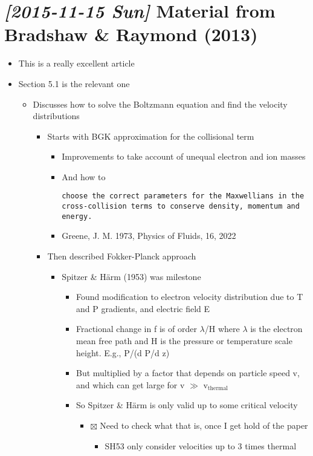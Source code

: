 \documentclass[11pt]{article}
\begin{document}
\section{\textit{[2015-11-15 Sun] } Material from Bradshaw \& Raymond (2013)}
\label{sec:orgheadline6}
\begin{itemize}
\item This is a really excellent article
\item Section 5.1 is the relevant one
\begin{itemize}
\item Discusses how to solve the Boltzmann equation and find the velocity distributions
\begin{itemize}
\item Starts with BGK approximation for the collisional term
\begin{itemize}
\item Improvements to take account of unequal electron and ion masses
\item And how to 
\begin{verbatim}
choose the correct parameters for the Maxwellians in the cross-collision terms to conserve density, momentum and energy.
\end{verbatim}
\item Greene, J. M. 1973, Physics of Fluids, 16, 2022
\end{itemize}
\item Then described Fokker-Planck approach
\begin{itemize}
\item Spitzer \& Härm (1953) was milestone
\begin{itemize}
\item Found modification to electron velocity distribution due to T and P gradients, and electric field E
\item Fractional change in f is of order \(\lambda\)/H where \(\lambda\) is the electron mean free path and H is the pressure or temperature scale height.  E.g., P/(d P/d z)
\item But multiplied by a factor that depends on particle speed v, and which can get large for v \(\gg\) v\(_{\text{thermal}}\)
\item So Spitzer \& Härm is only valid up to some critical velocity
\begin{itemize}
\item $\boxtimes$ Need to check what that is, once I get hold of the paper
\begin{itemize}
\item SH53 only consider velocities up to 3 times thermal

\end{itemize}
\end{itemize}
\end{itemize}
\end{itemize}
\end{itemize}
\end{itemize}
\end{itemize}
\end{document}
